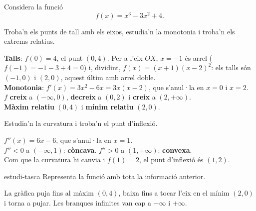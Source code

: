 Considera la funció
\[
f(x)=x^3-3x^2+4 .
\]

\begin{apartats}

Troba'n els punts de tall amb els eixos, estudia'n la monotonia i troba'n els extrems
relatius.

\begin{solucio}
\textbf{Talls}: $f(0)=4$, el punt $(0,4)$. Per a l'eix $OX$, $x=-1$ és arrel
($f(-1)=-1-3+4=0$) i, dividint, $f(x)=(x+1)(x-2)^2$: els talls són $(-1,0)$ i $(2,0)$, aquest
últim amb arrel doble.\\
\textbf{Monotonia}: $f'(x)=3x^2-6x=3x(x-2)$, que s'anul·la en $x=0$ i $x=2$.\\
$f$ \textbf{creix} a $(-\infty,0)$, \textbf{decreix} a $(0,2)$ i \textbf{creix} a
$(2,+\infty)$.\\
\textbf{Màxim relatiu} $(0,4)$ i \textbf{mínim relatiu} $(2,0)$.
\end{solucio}

\begin{nomesllarg}
Estudia'n la curvatura i troba'n el punt d'inflexió.

\begin{solucio}
$f''(x)=6x-6$, que s'anul·la en $x=1$.\\
$f''<0$ a $(-\infty,1)$: \textbf{còncava}. \quad $f''>0$ a $(1,+\infty)$: \textbf{convexa}.\\
Com que la curvatura hi canvia i $f(1)=2$, el punt d'inflexió és $(1,2)$.
\end{solucio}
\end{nomesllarg}

\begin{tria}{estudi-tasca}
Representa la funció amb tota la informació anterior.

\begin{solucio}
La gràfica puja fins al màxim $(0,4)$, baixa fins a tocar l'eix en el mínim $(2,0)$ i torna a
pujar. Les branques infinites van cap a $-\infty$ i $+\infty$.
\begin{center}
\end{center}
\end{solucio}


\end{tria}
\end{apartats}
